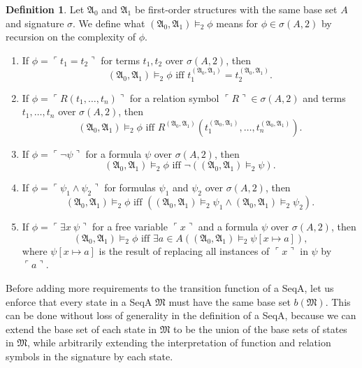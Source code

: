 \documentclass[12pt, twoside]{memoir}
\numberwithin{equation}{section}
\theoremstyle{definition}
\newtheorem{defi}[thm]{Definition}
\theoremstyle{remark}
\theoremstyle{definition}
\theoremstyle{definition}
\theoremstyle{definition}
\theoremstyle{remark}
\begin{document}
\begin{defi}
Let $\mathfrak{A}_0$ and $\mathfrak{A}_1$ be first-order structures with the same base set $A$ and signature $\sigma$. We define what $(\mathfrak{A}_0, \mathfrak{A}_1) \models_2 \phi$ means for $\phi \in \sigma(A, 2)$ by recursion on the complexity of $\phi$.
\begin{enumerate}[label=(\arabic*)]
    \item If $\phi = \ulcorner t_1 = t_2 \urcorner$ for terms $t_1, t_2$ over $\sigma(A, 2)$, then $$(\mathfrak{A}_0, \mathfrak{A}_1) \models_2 \phi \text{ iff } t_1^{(\mathfrak{A}_0, \mathfrak{A}_1)} = t_2^{(\mathfrak{A}_0, \mathfrak{A}_1)} \text{.}$$
    \item If $\phi = \ulcorner R(t_1, \dots, t_n) \urcorner$ for a relation symbol $\ulcorner R \urcorner \in \sigma(A, 2)$ and terms $t_1, \dots, t_n$ over $\sigma(A, 2)$, then $$(\mathfrak{A}_0, \mathfrak{A}_1) \models_2 \phi \text{ iff } R^{(\mathfrak{A}_0, \mathfrak{A}_1)} (t_1^{(\mathfrak{A}_0, \mathfrak{A}_1)}, \dots, t_n^{(\mathfrak{A}_0, \mathfrak{A}_1)}) \text{.}$$
    \item If $\phi = \ulcorner \neg \psi \urcorner$ for a formula $\psi$ over $\sigma(A, 2)$, then $$(\mathfrak{A}_0, \mathfrak{A}_1) \models_2 \phi \text{ iff } \neg ((\mathfrak{A}_0, \mathfrak{A}_1) \models_2 \psi) \text{.}$$
    \item If $\phi = \ulcorner \psi_1 \wedge \psi_2 \urcorner$ for formulas $\psi_1$ and $\psi_2$ over $\sigma(A, 2)$, then $$(\mathfrak{A}_0, \mathfrak{A}_1) \models_2 \phi \text{ iff } ((\mathfrak{A}_0, \mathfrak{A}_1) \models_2 \psi_1 \wedge (\mathfrak{A}_0, \mathfrak{A}_1) \models_2 \psi_2) \text{.}$$
    \item If $\phi = \ulcorner \exists x \ \psi \urcorner$ for a free variable $\ulcorner x \urcorner$ and a formula $\psi$ over $\sigma(A, 2)$, then $$(\mathfrak{A}_0, \mathfrak{A}_1) \models_2 \phi \text{ iff } \exists a \in A ((\mathfrak{A}_0, \mathfrak{A}_1) \models_2 \psi[x \mapsto a]) \text{,}$$ where $\psi[x \mapsto a]$ is the result of replacing all instances of $\ulcorner x \urcorner$ in $\psi$ by $\ulcorner a \urcorner$.
\end{enumerate}
\end{defi}

Before adding more requirements to the transition function of a SeqA, let us enforce that every state in a SeqA $\mathfrak{M}$ must have the same base set $b(\mathfrak{M})$. This can be done without loss of generality in the definition of a SeqA, because we can extend the base set of each state in $\mathfrak{M}$ to be the union of the base sets of states in $\mathfrak{M}$, while arbitrarily extending the interpretation of function and relation symbols in the signature by each state.
\end{document}
